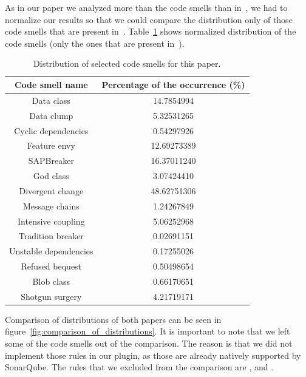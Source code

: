 As in our paper we analyzed more than the code smells than in~\cite{mannan2016understanding}, we had to normalize
our results so that we could compare the distribution only of those code smells that are present in~\cite{mannan2016understanding}.
Table~\ref{tab:sonar_academic_plugin_values} shows normalized distribution of the code smells (only the ones that
are present in~\cite{mannan2016understanding}).

\begin{table}
    \begin{center}
        \begin{tabular} {| c | c |}
            \hline
            \textbf{Code smell name} & \textbf{Percentage of the occurrence (\%)} \\ \hline
            Data class & 14.7854994 \\ \hline
            Data clump & 5.32531265 \\ \hline
            Cyclic dependencies & 0.54297926 \\ \hline
            Feature envy & 12.69273389 \\ \hline
            SAPBreaker & 16.37011240 \\ \hline
            God class & 3.07424410 \\ \hline
            Divergent change & 48.62751306 \\ \hline
            Message chains & 1.24267849 \\ \hline
            Intensive coupling & 5.06252968 \\ \hline
            Tradition breaker & 0.02691151 \\ \hline
            Unstable dependencies & 0.17255026 \\ \hline
            Refused bequest & 0.50498654 \\ \hline
            Blob class & 0.66170651 \\ \hline
            Shotgun surgery & 4.21719171 \\ \hline
        \end{tabular}
        \caption{Distribution of selected code smells for this paper.}
        \label{tab:sonar_academic_plugin_values}
    \end{center}
\end{table}

Comparison of distributions of both papers can be seen in figure~\ref{fig:comparison_of_distributions}.
It is important to note that we left some of the code smells out of the comparison.
The reason is that we did not implement those rules in our plugin, as those are already natively
supported by SonarQube.
The rules that we excluded from the comparison are ,  and
.


